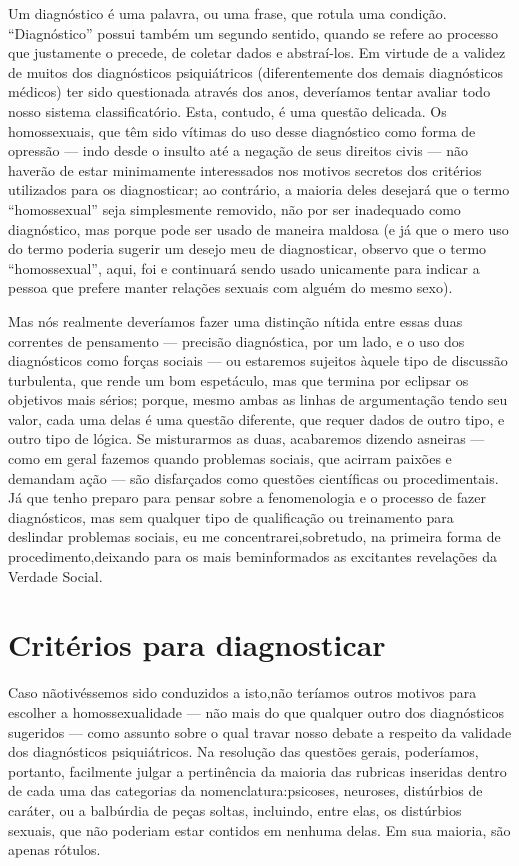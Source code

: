 Um diagnóstico é uma palavra, ou uma frase, que rotula uma condição.
``Diagnóstico'' possui também um segundo
sentido, quando se refere ao processo que justamente o precede, de
coletar dados e abstraí-los. Em virtude de a validez de muitos dos
diagnósticos psiquiátricos (diferentemente dos demais diagnósticos
médicos) ter sido questionada através dos anos, deveríamos tentar
avaliar todo nosso sistema classificatório. Esta, contudo, é uma
questão delicada. Os homossexuais, que têm sido vítimas do uso desse
diagnóstico como forma de opressão --- indo desde o insulto até a
negação de seus direitos civis --- não haverão de estar minimamente
interessados nos motivos secretos dos critérios utilizados para os
diagnosticar; ao contrário, a maioria deles desejará que o termo
``homossexual'' seja simplesmente removido,
não por ser inadequado como diagnóstico, mas porque pode ser usado de
maneira maldosa (e já que o mero uso do termo poderia sugerir um desejo
meu de diagnosticar, observo que o termo
``homossexual'', aqui, foi e continuará sendo
usado unicamente para indicar a pessoa que prefere manter relações
sexuais com alguém do mesmo sexo).

Mas nós realmente deveríamos fazer uma distinção nítida entre essas
duas correntes de pensamento --- precisão diagnóstica, por um lado, e
o uso dos diagnósticos como forças sociais\idxdiagforc{} --- ou estaremos sujeitos
àquele tipo de discussão turbulenta, que rende um bom espetáculo, mas
que termina por eclipsar os objetivos mais sérios; porque, mesmo ambas
as linhas de argumentação tendo seu valor, cada uma delas é uma questão
diferente, que requer dados de outro tipo, e outro tipo de lógica. Se
misturarmos as duas, acabaremos dizendo asneiras --- como em geral
fazemos quando problemas sociais, que acirram paixões e demandam ação
 --- são disfarçados como questões científicas ou procedimentais. Já
que tenho preparo para pensar sobre a fenomenologia e o processo de
fazer diagnósticos, mas sem qualquer tipo de qualificação ou\idxpervaspec{}
treinamento para deslindar problemas sociais, eu me concentrarei,\idxpervpecad[|)]
sobretudo, na primeira forma de procedimento,\idxpervaspec[|)] deixando para os mais bem\idxhomosaspe[|)]
informados as excitantes revelações da Verdade Social.\idxaspec[|)]

\section{Critérios para diagnosticar}

Caso não\idxmetod[|(] tivéssemos sido conduzidos a isto,\idxdiagcrit[|(] não teríamos outros
motivos para escolher a homossexualidade --- não mais do que qualquer
outro dos diagnósticos sugeridos --- como assunto sobre o qual travar
nosso debate a respeito da validade dos diagnósticos psiquiátricos. Na
resolução das questões gerais, poderíamos, portanto, facilmente julgar
a pertinência da maioria das rubricas inseridas dentro de cada uma das
categorias da nomenclatura:\idxdiagnome[|(] psicoses,\idxpsico{} neuroses,\idxneuro{} distúrbios de caráter,
ou a balbúrdia de peças soltas, incluindo, entre elas, os distúrbios
sexuais, que não poderiam estar contidos em nenhuma delas. Em sua
maioria, são apenas rótulos.\idxdiagrotu{}

